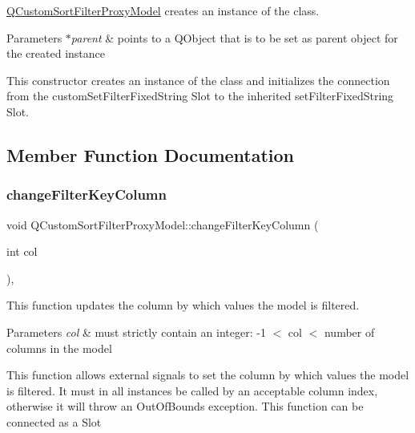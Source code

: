 \mbox{\hyperlink{class_q_custom_sort_filter_proxy_model}{Q\+Custom\+Sort\+Filter\+Proxy\+Model}} creates an instance of the class. 


\begin{DoxyParams}{Parameters}
{\em $\ast$parent} & points to a Q\+Object that is to be set as parent object for the created instance\\
\hline
\end{DoxyParams}
This constructor creates an instance of the class and initializes the connection from the custom\+Set\+Filter\+Fixed\+String Slot to the inherited set\+Filter\+Fixed\+String Slot. 

\subsection{Member Function Documentation}
\mbox{\label{class_q_custom_sort_filter_proxy_model_a32c931f0e638bb0f34090fd6beb622c8}} 
\subsubsection{\texorpdfstring{change\+Filter\+Key\+Column}{changeFilterKeyColumn}}
{\footnotesize\ttfamily void Q\+Custom\+Sort\+Filter\+Proxy\+Model\+::change\+Filter\+Key\+Column (\begin{DoxyParamCaption}\item[{int}]{col }\end{DoxyParamCaption})\hspace{0.3cm}{\ttfamily [inline]}, {\ttfamily [slot]}}



This function updates the column by which values the model is filtered. 


\begin{DoxyParams}{Parameters}
{\em col} & must strictly contain an integer\+: -\/1 $<$ col $<$ number of columns in the model\\
\hline
\end{DoxyParams}
This function allows external signals to set the column by which values the model is filtered. It must in all instances be called by an acceptable column index, otherwise it will throw an Out\+Of\+Bounds exception. This function can be connected as a Slot \mbox{\label{class_q_custom_sort_filter_proxy_model_ace5bb8380d35be434b27a12afb10fd95}} 
